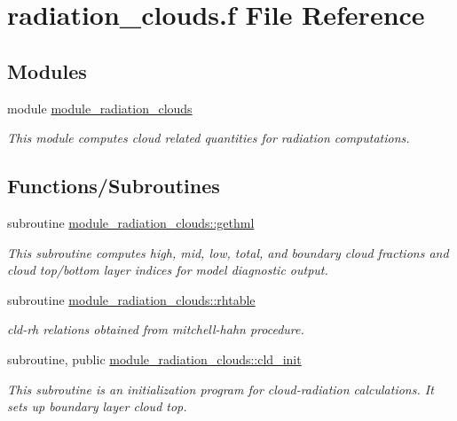 \hypertarget{radiation__clouds_8f}{}\section{radiation\+\_\+clouds.\+f File Reference}
\label{radiation__clouds_8f}
\subsection*{Modules}
\begin{DoxyCompactItemize}
\item 
module \hyperlink{namespacemodule__radiation__clouds}{module\+\_\+radiation\+\_\+clouds}
\begin{DoxyCompactList}\small\item\em This module computes cloud related quantities for radiation computations. \end{DoxyCompactList}\end{DoxyCompactItemize}
\subsection*{Functions/\+Subroutines}
\begin{DoxyCompactItemize}
\item 
subroutine \hyperlink{namespacemodule__radiation__clouds_a804b4ff009a185405e39838a907f8591}{module\+\_\+radiation\+\_\+clouds\+::gethml}                                                                                               
\begin{DoxyCompactList}\small\item\em This subroutine computes high, mid, low, total, and boundary cloud fractions and cloud top/bottom layer indices for model diagnostic output. \end{DoxyCompactList}\item 
subroutine \hyperlink{namespacemodule__radiation__clouds_a7b3ef3c22abd161058fd8880d86b538a}{module\+\_\+radiation\+\_\+clouds\+::rhtable}                                                                                             
\begin{DoxyCompactList}\small\item\em cld-\/rh relations obtained from mitchell-\/hahn procedure. \end{DoxyCompactList}\end{DoxyCompactItemize}
{\bf }\par
\begin{DoxyCompactItemize}
\item 
subroutine, public \hyperlink{namespacemodule__radiation__clouds_ab6fef8945e0a409b2e0968b414ba5573}{module\+\_\+radiation\+\_\+clouds\+::cld\+\_\+init}                                                                                           
\begin{DoxyCompactList}\small\item\em This subroutine is an initialization program for cloud-\/radiation calculations. It sets up boundary layer cloud top. \end{DoxyCompactList}\end{DoxyCompactItemize}

